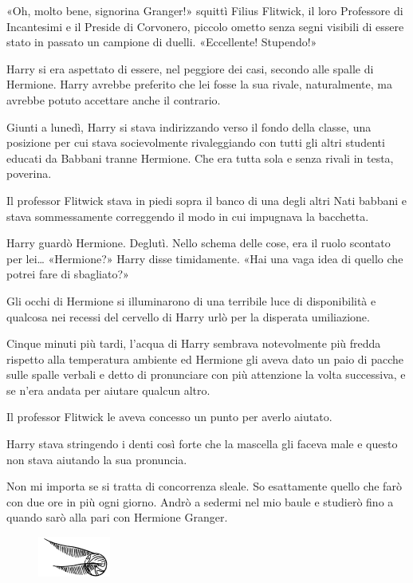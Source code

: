 «Oh, molto bene, signorina Granger!» squittì Filius Flitwick, il loro Professore di Incantesimi e il Preside di Corvonero, piccolo ometto senza segni visibili di essere stato in passato un campione di duelli. «Eccellente! Stupendo!»

Harry si era aspettato di essere, nel peggiore dei casi, secondo alle spalle di Hermione. Harry avrebbe preferito che lei fosse la sua rivale, naturalmente, ma avrebbe potuto accettare anche il contrario.

Giunti a lunedì, Harry si stava indirizzando verso il fondo della classe, una posizione per cui stava socievolmente rivaleggiando con tutti gli altri studenti educati da Babbani tranne Hermione. Che era tutta sola e senza rivali in testa, poverina.

Il professor Flitwick stava in piedi sopra il banco di una degli altri Nati babbani e stava sommessamente correggendo il modo in cui impugnava la bacchetta.

Harry guardò Hermione. Deglutì. Nello schema delle cose, era il ruolo scontato per lei… «Hermione?» Harry disse timidamente. «Hai una vaga idea di quello che potrei fare di sbagliato?»

Gli occhi di Hermione si illuminarono di una terribile luce di disponibilità e qualcosa nei recessi del cervello di Harry urlò per la disperata umiliazione.

Cinque minuti più tardi, l’acqua di Harry sembrava notevolmente più fredda rispetto alla temperatura ambiente ed Hermione gli aveva dato un paio di pacche sulle spalle verbali e detto di pronunciare con più attenzione la volta successiva, e se n’era andata per aiutare qualcun altro.

Il professor Flitwick le aveva concesso un punto per averlo aiutato.

Harry stava stringendo i denti così forte che la mascella gli faceva male e questo non stava aiutando la sua pronuncia.

Non mi importa se si tratta di concorrenza sleale. So esattamente quello che farò con due ore in più ogni giorno. Andrò a sedermi nel mio baule e studierò fino a quando sarò alla pari con Hermione Granger.

\begin{figure}[h!]
        \includegraphics[scale=0.4]{boccino.png}
        \centering
\end{figure}

